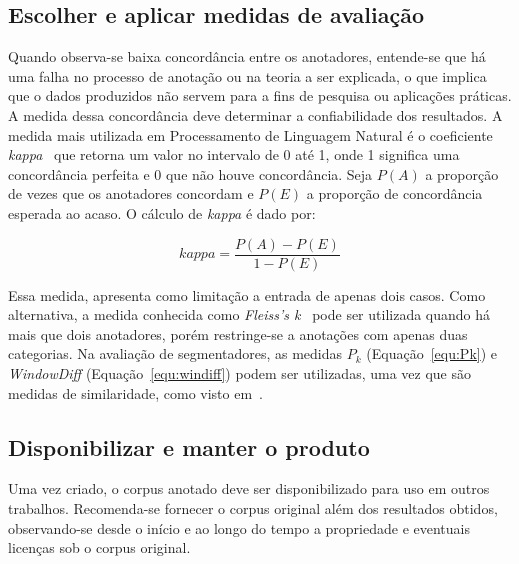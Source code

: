 \subsection{Escolher e aplicar medidas de avaliação}

Quando observa-se baixa concordância entre os anotadores, entende-se que há uma falha no processo de anotação ou na teoria a ser explicada, o que implica que o dados produzidos não servem para a fins de pesquisa ou aplicações práticas. A medida dessa concordância deve determinar a confiabilidade dos resultados.
A medida mais utilizada em Processamento de Linguagem Natural é o coeficiente \textit{kappa}~\cite{Carletta1996} que retorna um valor no intervalo de 0 até 1, onde 1 significa uma concordância perfeita e 0 que não houve concordância. Seja $P(A)$ a proporção de vezes que os anotadores concordam e $P(E)$ a proporção de concordância esperada ao acaso. O cálculo de \textit{kappa} é dado por:

\begin{equation}
	kappa = \frac{P(A) - P(E)}{1 - P(E)}
\end{equation}

Essa medida, apresenta como limitação a entrada de apenas dois casos. Como alternativa, a medida conhecida como \textit{Fleiss's k}~\cite{Fleiss1979} pode ser utilizada quando há mais que dois anotadores, porém restringe-se a anotações com apenas duas categorias. 
Na avaliação de segmentadores, as medidas $P_k$ (Equação~\ref{equ:Pk}) e \textit{WindowDiff} (Equação~\ref{equ:windiff}) podem ser utilizadas, uma vez que são medidas de similaridade, como visto em~\cite{Kazantseva2012,Cardoso2017}.



\subsection{Disponibilizar e manter o produto}

Uma vez criado, o corpus anotado deve ser disponibilizado para uso em outros trabalhos. 
Recomenda-se fornecer o corpus original além dos resultados obtidos, observando-se desde o início e ao longo do tempo a propriedade e eventuais licenças sob o corpus original.




